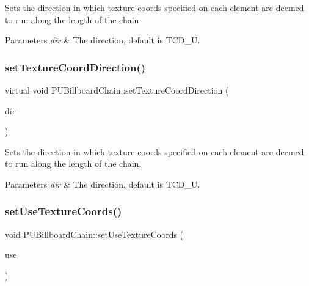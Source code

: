 Sets the direction in which texture coords specified on each element are deemed to run along the length of the chain. 
\begin{DoxyParams}{Parameters}
{\em dir} & The direction, default is T\+C\+D\+\_\+U. \\
\hline
\end{DoxyParams}
\mbox{\label{classPUBillboardChain_a0022ca3d4fbf8a04879eed49872e520a}} 
\subsubsection{\texorpdfstring{set\+Texture\+Coord\+Direction()}{setTextureCoordDirection()}\hspace{0.1cm}{\footnotesize\ttfamily [2/2]}}
{\footnotesize\ttfamily virtual void P\+U\+Billboard\+Chain\+::set\+Texture\+Coord\+Direction (\begin{DoxyParamCaption}\item[{\hyperlink{classPUBillboardChain_a6ebaec09a615199356b9d50fdab2209f}{Tex\+Coord\+Direction}}]{dir }\end{DoxyParamCaption})\hspace{0.3cm}{\ttfamily [virtual]}}

Sets the direction in which texture coords specified on each element are deemed to run along the length of the chain. 
\begin{DoxyParams}{Parameters}
{\em dir} & The direction, default is T\+C\+D\+\_\+U. \\
\hline
\end{DoxyParams}
\mbox{\label{classPUBillboardChain_a8afb13bc06161cc45d639d90704019ca}} 
\subsubsection{\texorpdfstring{set\+Use\+Texture\+Coords()}{setUseTextureCoords()}\hspace{0.1cm}{\footnotesize\ttfamily [1/2]}}
{\footnotesize\ttfamily void P\+U\+Billboard\+Chain\+::set\+Use\+Texture\+Coords (\begin{DoxyParamCaption}\item[{bool}]{use }\end{DoxyParamCaption})\hspace{0.3cm}{\ttfamily [virtual]}}

